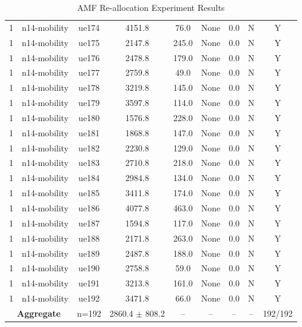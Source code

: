 \begin{table}[ht]
\begin{tabular}{|c|c|c|c|c|c|c|c|c|}
1 & n14-mobility & ue174 & 4151.8 & 76.0 & None & 0.0 & N & Y \\
1 & n14-mobility & ue175 & 2147.8 & 245.0 & None & 0.0 & N & Y \\
1 & n14-mobility & ue176 & 2478.8 & 179.0 & None & 0.0 & N & Y \\
1 & n14-mobility & ue177 & 2759.8 & 49.0 & None & 0.0 & N & Y \\
1 & n14-mobility & ue178 & 3219.8 & 145.0 & None & 0.0 & N & Y \\
1 & n14-mobility & ue179 & 3597.8 & 114.0 & None & 0.0 & N & Y \\
1 & n14-mobility & ue180 & 1576.8 & 228.0 & None & 0.0 & N & Y \\
1 & n14-mobility & ue181 & 1868.8 & 147.0 & None & 0.0 & N & Y \\
1 & n14-mobility & ue182 & 2230.8 & 129.0 & None & 0.0 & N & Y \\
1 & n14-mobility & ue183 & 2710.8 & 218.0 & None & 0.0 & N & Y \\
1 & n14-mobility & ue184 & 2984.8 & 134.0 & None & 0.0 & N & Y \\
1 & n14-mobility & ue185 & 3411.8 & 174.0 & None & 0.0 & N & Y \\
1 & n14-mobility & ue186 & 4077.8 & 463.0 & None & 0.0 & N & Y \\
1 & n14-mobility & ue187 & 1594.8 & 117.0 & None & 0.0 & N & Y \\
1 & n14-mobility & ue188 & 2171.8 & 263.0 & None & 0.0 & N & Y \\
1 & n14-mobility & ue189 & 2487.8 & 188.0 & None & 0.0 & N & Y \\
1 & n14-mobility & ue190 & 2758.8 & 59.0 & None & 0.0 & N & Y \\
1 & n14-mobility & ue191 & 3213.8 & 161.0 & None & 0.0 & N & Y \\
1 & n14-mobility & ue192 & 3471.8 & 66.0 & None & 0.0 & N & Y \\
\multicolumn{2}{|c|}{\textbf{Aggregate}} & n=192 & 2860.4 $\pm$ 808.2 & -- & -- & -- & -- & 192/192 \\
\hline
\end{tabular}
\caption{AMF Re-allocation Experiment Results}
\label{tab:amf_realloc}
\end{table}
